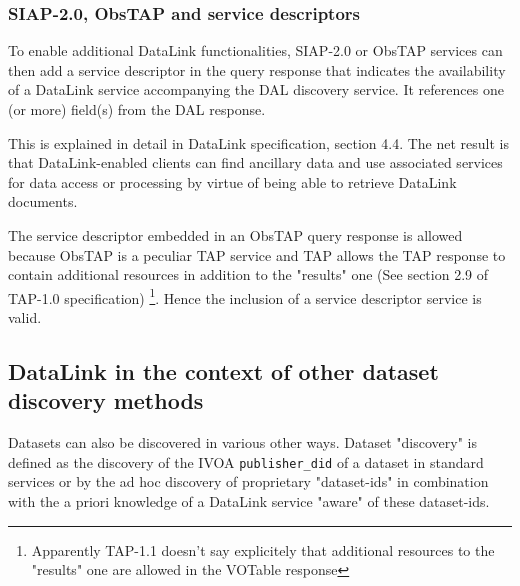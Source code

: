 \documentclass[11pt,a4paper]{ivoa}
\begin{document}
\subsubsection{SIAP-2.0, ObsTAP and service descriptors}
To  enable additional DataLink functionalities, SIAP-2.0 or ObsTAP services can then add 
a service descriptor in the query response that indicates the availability of a DataLink 
service accompanying the DAL discovery service.  It references one (or more) field(s) from 
the DAL response.

This is explained in  detail in DataLink specification, section 4.4. The net result is that 
DataLink-enabled clients can find ancillary data and use associated services for data access
or processing by virtue of being able to retrieve DataLink documents. 

The service descriptor embedded in an ObsTAP query response is allowed because ObsTAP 
is a peculiar TAP service and TAP allows the TAP response to contain additional resources 
in addition to the "results" one (See section 2.9 of TAP-1.0 specification)
\footnote{Apparently TAP-1.1 doesn't say explicitely that additional resources to the 
"results" one are allowed in the VOTable response}.  Hence the inclusion of a service 
descriptor service is valid.


\subsection{DataLink in the context of other dataset discovery methods} 
Datasets can also be discovered in various other ways. Dataset "discovery" is defined as
the discovery of the IVOA \verb|publisher_did| of a dataset in standard services or by the
ad hoc discovery of proprietary "dataset-ids" in combination with the a priori knowledge of
a DataLink service "aware" of these dataset-ids.
\end{document}
